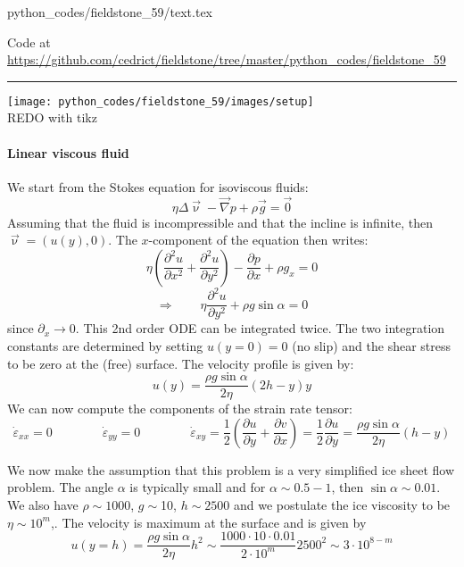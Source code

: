 \begin{flushright} {\tiny {\color{gray} python\_codes/fieldstone\_59/text.tex}} \end{flushright}



\begin{center}
Code at \url{https://github.com/cedrict/fieldstone/tree/master/python_codes/fieldstone_59}
\end{center}

\par\noindent\rule{\textwidth}{0.4pt}

\begin{center}
\texttt{[image: python\_codes/fieldstone\_59/images/setup]}\\
{\captionfont REDO with tikz}
\end{center}

\paragraph{Linear viscous fluid}

We start from the Stokes equation for isoviscous fluids:
\[
\eta \Delta \vec{\upnu} - \vec\nabla p + \rho \vec{g} = \vec{0}
\]
Assuming that the fluid is incompressible and that the incline is infinite, 
then $\vec{\upnu}=(u(y),0)$.
The $x$-component of the equation then writes:
\[
\eta\left(\frac{\partial^2 u}{\partial x^2}+\frac{\partial^2 u}{\partial y^2} \right)
- \frac{\partial p}{\partial x} + \rho g_x =0
\]
\[
\Rightarrow \qquad 
\eta\frac{\partial^2 u}{\partial y^2} 
+ \rho g \sin\alpha =0
\]
since $\partial_x\rightarrow 0$.
This 2nd order ODE can be integrated twice. The two integration constants are 
determined by setting $u(y=0)=0$ (no slip) and the shear stress to be zero at the (free)
surface. The velocity profile is given by:
\[
u(y)=\frac{\rho g \sin \alpha}{2 \eta} (2h-y)y
\]
We can now compute the components of the strain rate tensor:
\[
\dot{\varepsilon}_{xx}=0
\qquad
\qquad
\dot{\varepsilon}_{yy}=0
\qquad
\qquad
\dot{\varepsilon}_{xy}
=\frac{1}{2} \left( \frac{\partial u}{\partial y} + \frac{\partial v}{\partial x} \right)
=\frac{1}{2} \frac{\partial u}{\partial y} 
= \frac{\rho g \sin \alpha}{2 \eta} (h-y)
\]

We now make the assumption that this problem is a very simplified ice sheet flow problem.
The angle $\alpha$ is typically small and for $\alpha\sim 0.5-1$\degree, then $\sin\alpha\sim 0.01$. 
We also have $\rho\sim1000$, $g\sim$10,  $h\sim2500$ and we postulate the 
ice viscosity to be $\eta\sim 10^m$,.
The velocity is maximum at the surface and is given by
\begin{equation}
u(y=h)=
\frac{\rho g \sin \alpha}{2 \eta}h^2 
\sim \frac{1000 \cdot 10 \cdot 0.01}{ 2\cdot 10^m}2500^2
\sim 3\cdot 10^{8-m}
\label{eq:ice1}
\end{equation}

